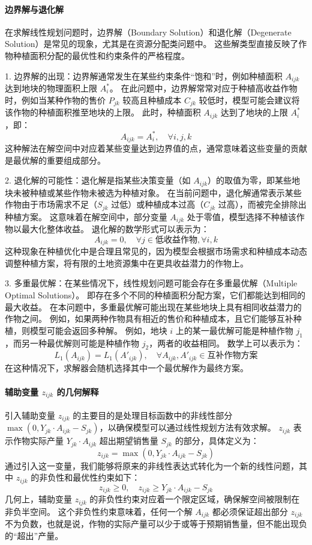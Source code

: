 \documentclass[12pt,a4paper]{nmmcm}
\begin{document}
\paragraph{边界解与退化解}

在求解线性规划问题时，边界解（Boundary Solution）和退化解（Degenerate Solution）是常见的现象，尤其是在资源分配类问题中。
这些解类型直接反映了作物种植面积分配的最优性和约束条件的严格程度。


1. 边界解的出现：边界解通常发生在某些约束条件“饱和”时，例如种植面积 $A_{ijk}$ 达到地块的物理面积上限 $A_i^*$。
在此问题中，边界解常常对应于种植高收益作物时，例如当某种作物的售价 $P_{jk}$ 较高且种植成本 $C_{jk}$ 较低时，模型可能会建议将该作物的种植面积推至地块的上限。
此时，种植面积 $A_{ijk}$ 达到了地块的上限 $A_i^*$，即：
\[
  A_{ijk} = A_i^*, \quad \forall i, j, k
\]
这种解法在解空间中对应着某些变量达到边界值的点，通常意味着这些变量的贡献是最优解的重要组成部分。


2. 退化解的可能性：退化解是指某些决策变量（如 $A_{ijk}$）的取值为零，即某些地块未被种植或某些作物未被选为种植对象。
在当前问题中，退化解通常表示某些作物由于市场需求不足（$S_{jk}$ 过低）或种植成本过高（$C_{jk}$ 过高），而被完全排除出种植方案。
这意味着在解空间中，部分变量 $A_{ijk}$ 处于零值，模型选择不种植该作物以最大化整体收益。
退化解的数学形式可以表示为：
\[
  A_{ijk} = 0, \quad \forall j \in \text{低收益作物}, \forall i, k
\]
这种现象在种植优化中是合理且常见的，因为模型会根据市场需求和种植成本动态调整种植方案，将有限的土地资源集中在更具收益潜力的作物上。


3. 多重最优解：在某些情况下，线性规划问题可能会存在多重最优解（Multiple Optimal Solutions）。
即存在多个不同的种植面积分配方案，它们都能达到相同的最大收益。
在本问题中，多重最优解可能出现在某些地块上具有相同收益潜力的作物之间。
例如，如果两种作物具有相近的售价和种植成本，且它们能够互补种植，则模型可能会返回多种解。
例如，地块 $i$ 上的某一最优解可能是种植作物 $j_1$，而另一种最优解则可能是种植作物 $j_2$，两者的收益相同。
数学上可以表示为：
\[
  L_1(A_{ijk}) = L_1(A'_{ijk}), \quad \forall A_{ijk}, A'_{ijk} \in \text{互补作物方案}
\]
在这种情况下，求解器会随机选择其中一个最优解作为最终方案。





\paragraph{辅助变量 $z_{ijk}$ 的几何解释}

引入辅助变量 $z_{ijk}$ 的主要目的是处理目标函数中的非线性部分 $\max(0, Y_{jk} \cdot A_{ijk} - S_{jk})$，以确保模型可以通过线性规划方法有效求解。
$z_{ijk}$ 表示作物实际产量 $Y_{jk} \cdot A_{ijk}$ 超出期望销售量 $S_{jk}$ 的部分，具体定义为：
\[
  z_{ijk} = \max(0, Y_{jk} \cdot A_{ijk} - S_{jk})
\]
通过引入这一变量，我们能够将原来的非线性表达式转化为一个新的线性问题，其中 $z_{ijk}$ 的非负性和最优性约束如下：
\[
  z_{ijk} \geq 0, \quad z_{ijk} \geq Y_{jk} \cdot A_{ijk} - S_{jk}
\]
几何上，辅助变量 $z_{ijk}$ 的非负性约束对应着一个限定区域，确保解空间被限制在非负半空间。
这个非负性约束意味着，任何一个解 $A_{ijk}$ 都必须保证超出部分 $z_{ijk}$ 不为负数，也就是说，作物的实际产量可以少于或等于预期销售量，但不能出现负的“超出”产量。
\end{document}
